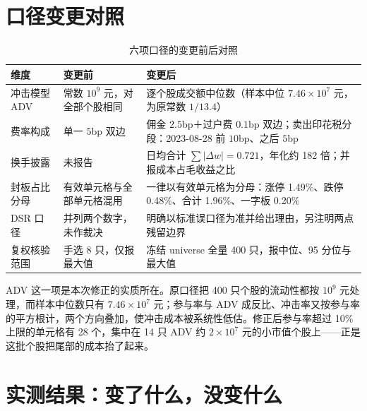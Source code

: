 \documentclass[11pt,a4paper]{ctexart}
\begin{document}
\section{口径变更对照}

\begin{table}[htbp]
\centering
\caption{六项口径的变更前后对照}
\label{tab:caliber}
\begin{tabular}{@{}>{\raggedright\arraybackslash}p{2.6cm}>{\raggedright\arraybackslash}p{5.4cm}>{\raggedright\arraybackslash}p{6.4cm}@{}}
\toprule
维度 & 变更前 & 变更后 \\
\midrule
冲击模型 ADV & 常数 $10^9$ 元，对全部个股相同 & 逐个股成交额中位数（样本中位 $7.46\times10^7$ 元，为原常数 $1/13.4$） \\
费率构成 & 单一 $5$bp 双边 & 佣金 $2.5$bp＋过户费 $0.1$bp 双边；卖出印花税分段：2023-08-28 前 $10$bp、之后 $5$bp \\
换手披露 & 未报告 & 日均合计 $\sum|\Delta w|=0.721$，年化约 182 倍；并报成本占毛收益之比 \\
封板占比分母 & 有效单元格与全部单元格混用 & 一律以有效单元格为分母：涨停 1.49\%、跌停 0.48\%、合计 1.96\%、一字板 0.20\% \\
DSR 口径 & 并列两个数字，未作裁决 & 明确以标准误口径为准并给出理由，另注明两点残留边界 \\
复权核验范围 & 手选 8 只，仅报最大值 & 冻结 universe 全量 400 只，报中位、95 分位与最大值 \\
\bottomrule
\end{tabular}
\end{table}

ADV 这一项是本次修正的实质所在。原口径把 400 只个股的流动性都按 $10^9$ 元处理，而样本中位数只有 $7.46\times10^7$ 元；参与率与 ADV 成反比、冲击率又按参与率的平方根计，两个方向叠加，使冲击成本被系统性低估。修正后参与率超过 10\% 上限的单元格有 28 个，集中在 14 只 ADV 约 $2\times10^7$ 元的小市值个股上——正是这批个股把尾部的成本抬了起来。

\section{实测结果：变了什么，没变什么}\label{sec:delta}
\end{document}
